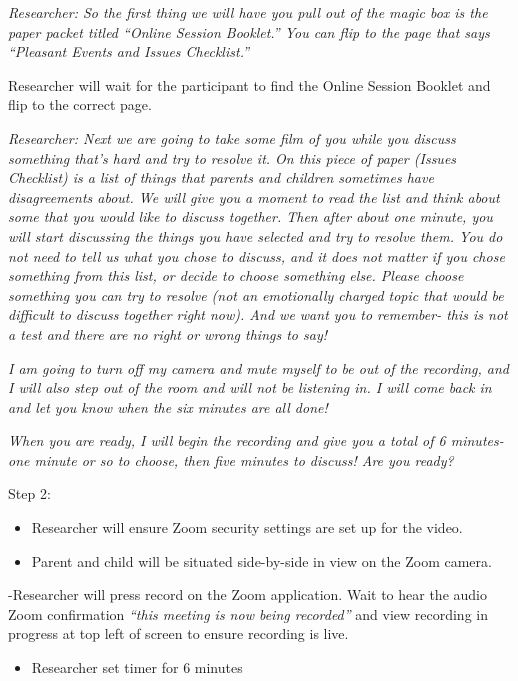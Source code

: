 \documentclass[]{book}
\providecommand{\tightlist}{%
  \setlength{\itemsep}{0pt}\setlength{\parskip}{0pt}}
\begin{document}
\emph{Researcher: So the first thing we will have you pull out of the magic box is the paper packet titled ``Online Session Booklet.'' You can flip to the page that says ``Pleasant Events and Issues Checklist.''}

Researcher will wait for the participant to find the Online Session Booklet and flip to the correct page.

\emph{Researcher: Next we are going to take some film of you while you discuss something that's hard and try to resolve it. On this piece of paper (Issues Checklist) is a list of things that parents and children sometimes have disagreements about. We will give you a moment to read the list and think about some that you would like to discuss together. Then after about one minute, you will start discussing the things you have selected and try to resolve them. You do not need to tell us what you chose to discuss, and it does not matter if you chose something from this list, or decide to choose something else. Please choose something you can try to resolve (not an emotionally charged topic that would be difficult to discuss together right now). And we want you to remember- this is not a test and there are no right or wrong things to say!}

\emph{I am going to turn off my camera and mute myself to be out of the recording, and I will also step out of the room and will not be listening in. I will come back in and let you know when the six minutes are all done!}

\emph{When you are ready, I will begin the recording and give you a total of 6 minutes- one minute or so to choose, then five minutes to discuss! Are you ready?}

Step 2:

\begin{itemize}
\item
  Researcher will ensure Zoom security settings are set up for the video.
\item
  Parent and child will be situated side-by-side in view on the Zoom camera.
\end{itemize}

-Researcher will press record on the Zoom application. Wait to hear the audio Zoom confirmation \emph{``this meeting is now being recorded''} and view recording in progress at top left of screen to ensure recording is live.

\begin{itemize}
\tightlist
\item
  Researcher set timer for 6 minutes
\end{itemize}
\end{document}
